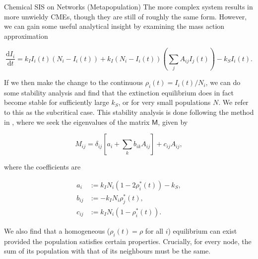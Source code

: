 \documentclass{beamer}
\newlength{\onecolwid}
\begin{document}
\begin{frame}[t]
\begin{columns}[t]
\begin{column}{\onecolwid}
\begin{block}{Chemical SIS on Networks (Metapopulation)}
The more complex system results in more unwieldy CMEs, though they are still of roughly the same form. However, we can gain some useful analytical insight by examining the mass action approximation

\begin{equation}
	\frac {\mathrm d I_i}{\mathrm d t} = k_I I_i(t) (N_i - I_i(t)) + k_I (N_i - I_i(t)) (\sum_j A_{ij} I_j(t)) - k_S I_i(t).
\end{equation}

If we then make the change to the continuous $\rho_i(t) = I_i(t) / N_i$, we can do some stability analysis and find that the extinction equilibrium does in fact become stable for sufficiently large $k_S$, or for very small populations $N$. We refer to this as the subcritical case. This stability analysis is done following the method in \cite{porterDynamicalSystemsNetworks2015}, where we seek the eigenvalues of the matrix $\bm{\mathsf{{M}}}$, given by

\begin{equation}
	M_{ij} = \delta_{ij} \left[ a_i + \sum_k b_{ik} A_{ij} \right] + c_{ij} A_{ij},
\end{equation}

where the coefficients are

\begin{align}
	a_i &:= k_I N_i (1 - 2 \rho_i^*(t)) - k_S, \\
	b_{ij} &:= -k_I N_i \rho_j^*(t), \\
	c_{ij} &:= k_I N_i (1 - \rho_i^*(t)).
\end{align}

We also find that a homogeneous ($\rho_i(t) = \rho$ for all $i$) equilibrium can exist provided the population satisfies certain properties. Crucially, for every node, the sum of its population with that of its neighbours must be the same.


\end{block}
\end{column}
\end{columns}
\end{frame}
\end{document}
